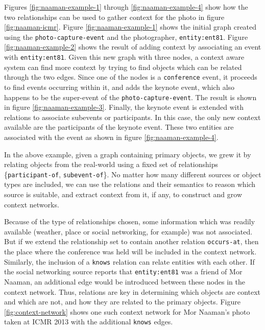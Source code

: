 Figures \ref{fig:naaman-example-1} through \ref{fig:naaman-example-4} show how the two relationships can be used to gather context for the photo in figure \ref{fig:naaman-icmr}. Figure \ref{fig:naaman-example-1} shows the initial graph created using the \texttt{photo-capture-event} and the photographer, \texttt{entity:ent81}. Figure \ref{fig:naaman-example-2} shows the result of adding context by associating an event with \texttt{entity:ent81}. Given this new graph with three nodes, a context aware system can find more context by trying to find objects which can be related through the two edges. Since one of the nodes is a \texttt{conference} event, it proceeds to find events occurring within it, and adds the keynote event, which also happens to be the super-event of the \texttt{photo-capture-event}. The result is shown in figure \ref{fig:naaman-example-3}. Finally, the keynote event is extended with relations to associate subevents or participants. In this case, the only new context available are the participants of the keynote event. These two entities are associated with the event as shown in figure \ref{fig:naaman-example-4}. 

In the above example, given a graph containing primary objects, we grew it by relating objects from the real-world using a fixed set of relationships \{\texttt{participant-of}, \texttt{subevent-of}\}. No matter how many different sources or object types are included, we can use the relations and their semantics to reason which source is suitable, and extract context from it, if any, to construct and grow context networks. 

Because of the type of relationships chosen, some information which was readily available (weather, place or social networking, for example) was not associated. But if we extend the relationship set to contain another relation \texttt{occurs-at}, then the place where the conference was held will be included in the context network. Similarly, the inclusion of a \texttt{knows} relation can relate entities with each other. If the social networking source reports that \texttt{entity:ent81} was a friend of Mor Naaman, an additional edge would be introduced between these nodes in the context network. Thus, relations are key in determining which objects are context and which are not, and how they are related to the primary objects. Figure \ref{fig:context-network} shows one such context network for Mor Naaman's photo taken at ICMR 2013 with the additional \texttt{knows} edges.

